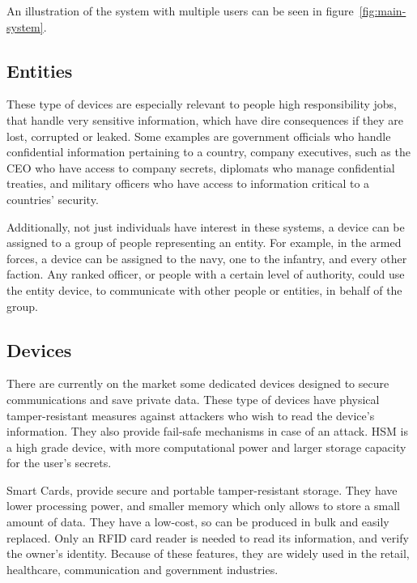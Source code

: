 An illustration of the system with multiple users can be seen in figure~\ref{fig:main-system}.

\subsection{Entities}\label{chap:problem:entities}

These type of devices are especially relevant to people high responsibility jobs, that handle very sensitive information, which have dire consequences if they are lost, corrupted or leaked.
Some examples are government officials who handle confidential information pertaining to a country, company executives, such as the CEO who have access to company secrets, diplomats who manage confidential treaties, and military officers who have access to information critical to a countries' security.

Additionally, not just individuals have interest in these systems, a device can be assigned to a group of people representing an entity. For example, in the armed forces, a device can be assigned to the navy, one to the infantry, and every other faction. Any ranked officer, or people with a certain level of authority, could use the entity device, to communicate with other people or entities, in behalf of the group.

\subsection{Devices}\label{chap:problem:devices}
There are currently on the market some dedicated devices designed to secure communications and save private data.
These type of devices have physical tamper-resistant measures against attackers who wish to read the device's information. They also provide fail-safe mechanisms in case of an attack.
\ac{HSM} is a high grade device, with more computational power and larger storage capacity for the user's secrets.

Smart Cards, provide secure and portable tamper-resistant storage.
They have lower processing power, and smaller memory which only allows to store a small amount of data.
They have a low-cost, so can be produced in bulk and easily replaced. Only an RFID card reader is needed to read its information, and verify the owner's identity.
Because of these features, they are widely used in the retail, healthcare, communication and government industries.


